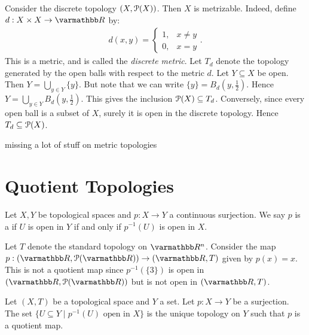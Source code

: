 \begin{example}
    Consider the discrete topology $(X,\mathcal{P}(X))$. Then $X$ is metrizable. Indeed, define $d:X \times X \rightarrow \bfR$ by:
        \begin{equation*}
        \begin{split}
            d(x,y) = \begin{cases} 1, & x\neq y \\ 0, & x = y\end{cases}.
        \end{split}
        \end{equation*}
    This is a metric, and is called the \textit{discrete metric}. Let $T_d$ denote the topology generated by the open balls with respect to the metric $d$. Let $Y \subseteq X$ be open. Then $Y = \bigcup_{y \in Y} \{y\}$. But note that we can write $\{y\} = B_d(y, \frac{1}{2})$. Hence $Y = \bigcup_{y \in Y}B_d(y,\frac{1}{2})$. This gives the inclusion $\mathcal{P}(X) \subseteq T_d$. Conversely, since every open ball is a subset of $X$, surely it is open in the discrete topology. Hence $T_d \subseteq \mathcal{P}(X)$.
\end{example}

{\color{red} missing a lot of stuff on metric topologies}

\section{Quotient Topologies}

\begin{definition}
    Let $X,Y$ be topological spaces and $p:X \rightarrow Y$ a continuous surjection. We say $p$ is a  if $U$ is open in $Y$ if and only if $p^{-1}(U)$ is open in $X$.
\end{definition}

\begin{example}
    Let $T$ denote the standard topology on $\bfR^n$. Consider the map $p:(\bfR,\cP(\bfR)) \rightarrow (\bfR,T)$ given by $p(x) = x$. This is not a quotient map since $p^{-1}(\{3\})$ is open in $(\bfR,\cP(\bfR))$ but is not open in $(\bfR,T)$.
\end{example}

\begin{proposition}\label{prop:unique-quotient-top}
    Let $(X,T)$ be a topological space and $Y$ a set. Let $p:X \rightarrow Y$ be a surjection. The set $\{U \subseteq Y \mid p^{-1}(U) \text{ open in }X\}$ is the unique topology on $Y$ such that $p$ is a quotient map.
\end{proposition}

